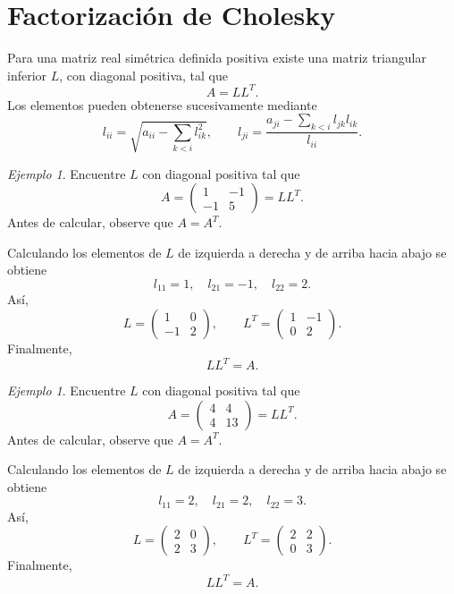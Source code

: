 \documentclass[12pt]{article}
\theoremstyle{remark}
\newtheorem{Ejem}[definicion]{Ejemplo}
\begin{document}
\section{Factorización de Cholesky}

Para una matriz real simétrica definida positiva existe una matriz triangular inferior $L$, con diagonal positiva, tal que
\[
\boxed{A=LL^T}.
\]
Los elementos pueden obtenerse sucesivamente mediante
\[
l_{ii}=\sqrt{a_{ii}-\sum_{k<i}l_{ik}^2},\qquad
l_{ji}=\frac{a_{ji}-\sum_{k<i}l_{jk}l_{ik}}{l_{ii}}.
\]

\begin{Ejem}
Encuentre $L$ con diagonal positiva tal que
\[
A=\begin{pmatrix}1 & -1\\-1 & 5\end{pmatrix}=LL^T.
\]
Antes de calcular, observe que $A=A^T$.

Calculando los elementos de $L$ de izquierda a derecha y de arriba hacia abajo se obtiene
\[
l_{11}=1,\quad l_{21}=-1,\quad l_{22}=2.
\]
Así,
\[
L=\begin{pmatrix}1 & 0\\-1 & 2\end{pmatrix},\qquad L^T=\begin{pmatrix}1 & -1\\0 & 2\end{pmatrix}.
\]
Finalmente,
\[
\boxed{LL^T=A}.
\]
\end{Ejem}

\begin{Ejem}
Encuentre $L$ con diagonal positiva tal que
\[
A=\begin{pmatrix}4 & 4\\4 & 13\end{pmatrix}=LL^T.
\]
Antes de calcular, observe que $A=A^T$.

Calculando los elementos de $L$ de izquierda a derecha y de arriba hacia abajo se obtiene
\[
l_{11}=2,\quad l_{21}=2,\quad l_{22}=3.
\]
Así,
\[
L=\begin{pmatrix}2 & 0\\2 & 3\end{pmatrix},\qquad L^T=\begin{pmatrix}2 & 2\\0 & 3\end{pmatrix}.
\]
Finalmente,
\[
\boxed{LL^T=A}.
\]

\end{Ejem}
\end{document}
